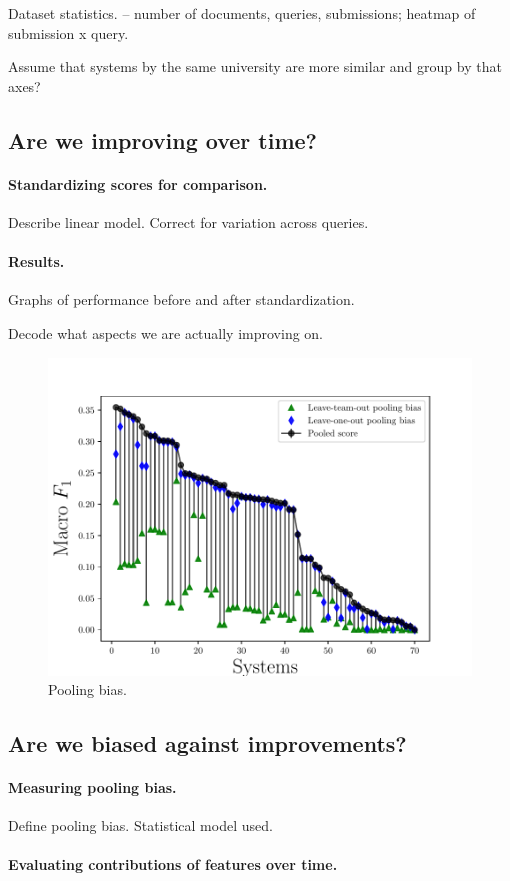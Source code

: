 Dataset statistics. -- number of documents, queries, submissions; heatmap of submission x query.

Assume that systems by the same university are more similar and group by that axes?

\subsection{Are we improving over time?}

\paragraph{Standardizing scores for comparison.}

Describe linear model.
Correct for variation across queries.

\paragraph{Results.}

Graphs of performance before and after standardization.

Decode what aspects we are actually improving on.


\begin{figure}
  \includegraphics[width=\columnwidth]{figures/experiment2}
  \caption{Pooling bias.}
\end{figure}


\subsection{Are we biased against improvements?}

\paragraph{Measuring pooling bias.}
Define pooling bias. Statistical model used.

\paragraph{Evaluating contributions of features over time.}

